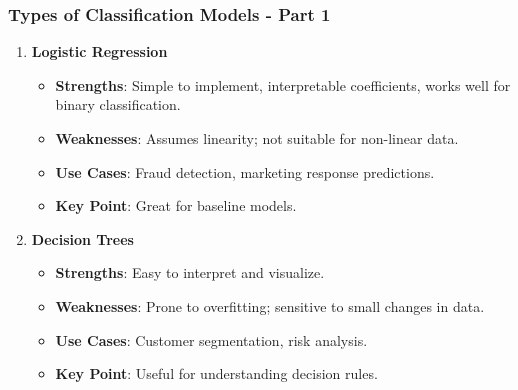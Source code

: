 \documentclass[aspectratio=169]{beamer}
\begin{document}
\begin{frame}[fragile]
    \frametitle{Types of Classification Models - Part 1}
    \begin{enumerate}
        \item \textbf{Logistic Regression}
            \begin{itemize}
                \item \textbf{Strengths}: Simple to implement, interpretable coefficients, works well for binary classification.
                \item \textbf{Weaknesses}: Assumes linearity; not suitable for non-linear data.
                \item \textbf{Use Cases}: Fraud detection, marketing response predictions.
                \item \textbf{Key Point}: Great for baseline models.
            \end{itemize}

        \item \textbf{Decision Trees}
            \begin{itemize}
                \item \textbf{Strengths}: Easy to interpret and visualize.
                \item \textbf{Weaknesses}: Prone to overfitting; sensitive to small changes in data.
                \item \textbf{Use Cases}: Customer segmentation, risk analysis.
                \item \textbf{Key Point}: Useful for understanding decision rules.
            \end{itemize}
    \end{enumerate}
\end{frame}
\end{document}
